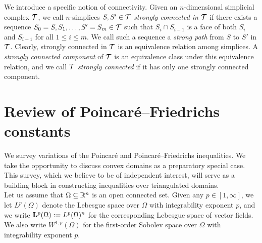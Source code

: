 \documentclass[12pt,a4paper]{article}
\begin{document}
We introduce a specific notion of connectivity. 
Given an $n$-dimensional simplicial complex ${\mathcal T}$, 
we call $n$-simplices $S,S' \in {\mathcal T}$ \emph{strongly connected in ${\mathcal T}$} if there exists a sequence $S_0=S,S_1,\dots,S'=S_m \in {\mathcal T}$ such that $S_{i} \cap S_{i-1}$ is a face of both $S_{i}$ and $S_{i-1}$ for all $1 \leq i \leq m$. 
We call such a sequence a \emph{strong path} from $S$ to $S'$ in ${\mathcal T}$. 
Clearly, strongly connected in ${\mathcal T}$ is an equivalence relation among simplices. 
A \emph{strongly connected component} of ${\mathcal T}$ is an equivalence class under this equivalence relation, 
and we call ${\mathcal T}$ \emph{strongly connected} if it has only one strongly connected component. 











































\section{Review of Poincar\'e--Friedrichs constants}\label{section:poincare}

We survey variations of the Poincar\'e and Poincar\'e--Friedrichs inequalities. 
We take the opportunity to discuss convex domains as a preparatory special case.
This survey, which we believe to be of independent interest, will serve as a building block in constructing inequalities over triangulated domains.
\\

Let us assume that $\Omega \subseteq {\mathbb R}^{n}$ is an open connected set. 
Given any $p \in [1,\infty]$, we let $L^p(\Omega)$ denote the Lebesgue space over $\Omega$ with integrability exponent $p$, and we write ${\mathbf L}^p(\Omega) := L^p(\Omega)^{n}$ for the corresponding Lebesgue space of vector fields. 
We also write $W^{1,p}(\Omega)$ for the first-order Sobolev space over $\Omega$ with integrability exponent $p$. 
\end{document}
